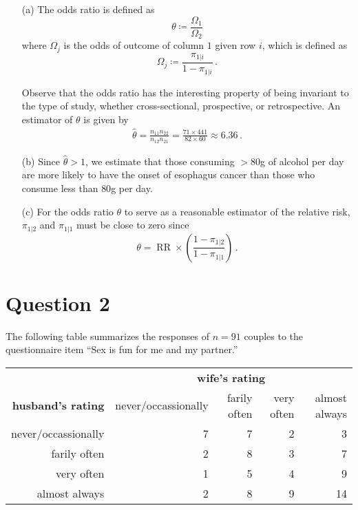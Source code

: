 \documentclass[10pt]{fphw}
\begin{document}
\begin{enumerate}
    \item[(a)] The odds ratio is defined as
    \begin{equation*}
    \theta \coloneqq \frac{\Omega_1}{\Omega_2}
    \end{equation*}
    where $\Omega_j$ is the odds of outcome of column $1$ given row $i$, which is defined as
    \begin{equation*}
    \Omega_j \coloneqq \frac{\pi_{1|i}}{1-\pi_{1|i}}\,.
    \end{equation*}
    
    Observe that the odds ratio has the interesting property of being invariant
    to the type of study, whether cross-sectional, prospective, or retrospective.
    An estimator of $\theta$ is given by
    \begin{align*}
    \hat\theta = \frac{n_{1 1} n_{2 2}}{n_{1 2} n_{2 1}} = \frac{71 \times 441}{ 82 \times 60} \approx 6.36\,.
    \end{align*}
    
    \item[(b)] Since $\hat\theta > 1$, we estimate that those consuming $>80$g of alcohol per day are more likely
    to have the onset of esophagus cancer than those who consume less than $80$g per day.
    
    \item[(c)] For the odds ratio $\theta$ to serve as a reasonable estimator of the relative risk,
    $\pi_{1|2}$ and $\pi_{1|1}$ must be close to zero since
    \begin{equation*}
        \theta = \operatorname{RR}\times\left(\frac{1-\pi_{1|2}}{1-\pi_{1|1}}\right)\,.
    \end{equation*}
\end{enumerate}  

\section{Question 2}
The following table summarizes the responses of $n=91$ couples to the questionnaire item
``Sex is fun for me and my partner.''
\begin{table}[h]
    \centering
    \begin{tabular}{@{}rrrrr@{}}
        \toprule
                              & \multicolumn{4}{c}{\bf{wife's rating}} \\
        \bf{husband's rating} & never/occassionally & farily often & very often & almost always\\
        never/occassionally   & 7 	              & 7    	     & 2          & 3\\
        farily often          & 2 	              & 8    	     & 3          & 7\\
        very often            & 1 	              & 5    	     & 4          & 9\\
        almost always         & 2 	              & 8    	     & 9          & 14\\
        \bottomrule
    \end{tabular}
\end{table}
\end{document}
